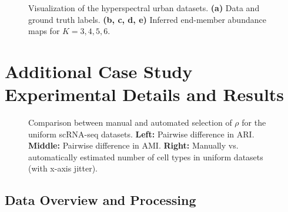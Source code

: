 \begin{figure}[h!]
  \caption{Visualization of the hyperspectral urban datasets.
  \textbf{(a)} Data and ground truth labels.
  \textbf{(b, c, d, e)} Inferred end-member abundance maps for $K=3,4,5,6$.}
	\label{fig:hyprunmix_gt}
\end{figure}

\section{Additional Case Study Experimental Details and Results}
\label{sec:case-study-details}

\begin{figure}[tp]
	\centering



	\caption{Comparison between manual and automated selection of $\rho$ for the \textsf{uniform} scRNA-seq datasets. 
        \textbf{Left:} Pairwise difference in ARI. 
		\textbf{Middle:} Pairwise difference in AMI.
		\textbf{Right:}
        Manually vs. automatically estimated number of cell types in uniform datasets (with x-axis jitter).} 
	\label{fig:auto_comp_unif}
\end{figure}

\subsection{Data Overview and Processing}
\label{sec:rna-data}

